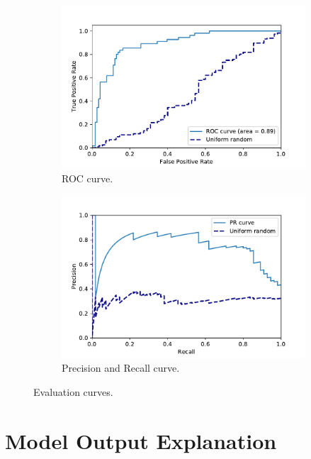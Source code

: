 \begin{figure}
\centering
\begin{subfigure}{.5\textwidth}
  \centering
  \includegraphics[width=1\linewidth]{figures/Experiements/Eval/ROC_curve.pdf}
  \caption{ROC curve.}
  \label{fig:roc_curve}
\end{subfigure}%
\begin{subfigure}{.5\textwidth}
  \centering
  \includegraphics[width=1\linewidth]{figures/Experiements/Eval/pr_curve_curve.pdf}
  \caption{Precision and Recall curve.}
  \label{fig:pr_curve}
\end{subfigure}
\caption[Curve]{Evaluation curves.}
\label{fig:roc_and_pr_curve}
\end{figure}

\newpage
\section{Model Output Explanation}

